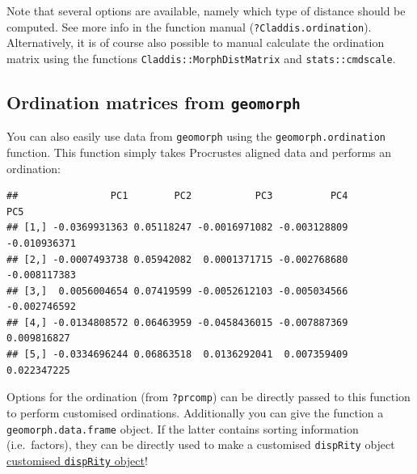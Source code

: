 \documentclass[]{book}
\newenvironment{Shaded}{\begin{snugshade}}{\end{snugshade}}
\newcommand{\KeywordTok}[1]{\textcolor[rgb]{0.13,0.29,0.53}{\textbf{#1}}}
\newcommand{\DataTypeTok}[1]{\textcolor[rgb]{0.13,0.29,0.53}{#1}}
\newcommand{\DecValTok}[1]{\textcolor[rgb]{0.00,0.00,0.81}{#1}}
\newcommand{\StringTok}[1]{\textcolor[rgb]{0.31,0.60,0.02}{#1}}
\newcommand{\OtherTok}[1]{\textcolor[rgb]{0.56,0.35,0.01}{#1}}
\newcommand{\OperatorTok}[1]{\textcolor[rgb]{0.81,0.36,0.00}{\textbf{#1}}}
\newcommand{\NormalTok}[1]{#1}
\theoremstyle{definition}
\theoremstyle{definition}
\theoremstyle{remark}
\begin{document}
Note that several options are available, namely which type of distance
should be computed. See more info in the function manual
(\texttt{?Claddis.ordination}). Alternatively, it is of course also
possible to manual calculate the ordination matrix using the functions
\texttt{Claddis::MorphDistMatrix} and \texttt{stats::cmdscale}.

\subsection{\texorpdfstring{Ordination matrices from
\texttt{geomorph}}{Ordination matrices from geomorph}}\label{ordination-matrices-from-geomorph}

You can also easily use data from \texttt{geomorph} using the
\texttt{geomorph.ordination} function. This function simply takes
Procrustes aligned data and performs an ordination:

\begin{Shaded}
\end{Shaded}

\begin{verbatim}
##                PC1        PC2           PC3          PC4          PC5
## [1,] -0.0369931363 0.05118247 -0.0016971082 -0.003128809 -0.010936371
## [2,] -0.0007493738 0.05942082  0.0001371715 -0.002768680 -0.008117383
## [3,]  0.0056004654 0.07419599 -0.0052612103 -0.005034566 -0.002746592
## [4,] -0.0134808572 0.06463959 -0.0458436015 -0.007887369  0.009816827
## [5,] -0.0334696244 0.06863518  0.0136292041  0.007359409  0.022347225
\end{verbatim}

Options for the ordination (from \texttt{?prcomp}) can be directly
passed to this function to perform customised ordinations. Additionally
you can give the function a \texttt{geomorph.data.frame} object. If the
latter contains sorting information (i.e.~factors), they can be directly
used to make a customised \texttt{dispRity} object
\protect\hyperlink{customised-subsets}{customised \texttt{dispRity}
object}!
\end{document}
